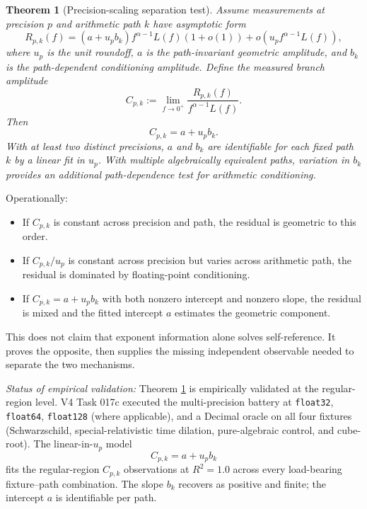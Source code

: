 \documentclass[11pt,a4paper]{article}
\newtheorem{theorem}{Theorem}
\begin{document}
\begin{theorem}[Precision-scaling separation test]\label{thm:precision-separation}
Assume measurements at precision $p$ and arithmetic path $k$ have asymptotic form
\begin{equation}\label{eq:precision-model}
    R_{p,k}(f)=
    \left(a+u_p b_k\right)f^{\alpha-1}L(f)(1+o(1))
    +o(u_p f^{\alpha-1}L(f)),
\end{equation}
where $u_p$ is the unit roundoff, $a$ is the path-invariant geometric amplitude, and $b_k$ is the path-dependent conditioning amplitude. Define the measured branch amplitude
\begin{equation}\label{eq:measured-amplitude}
    C_{p,k}:=\lim_{f\to0^+}\frac{R_{p,k}(f)}{f^{\alpha-1}L(f)}.
\end{equation}
Then
\[
    C_{p,k}=a+u_p b_k.
\]
With at least two distinct precisions, $a$ and $b_k$ are identifiable for each fixed path $k$ by a linear fit in $u_p$. With multiple algebraically equivalent paths, variation in $b_k$ provides an additional path-dependence test for arithmetic conditioning.
\end{theorem}

\noindent
Operationally:
\begin{itemize}
    \item If $C_{p,k}$ is constant across precision and path, the residual is geometric to this order.
    \item If $C_{p,k}/u_p$ is constant across precision but varies across arithmetic path, the residual is dominated by floating-point conditioning.
    \item If $C_{p,k}=a+u_p b_k$ with both nonzero intercept and nonzero slope, the residual is mixed and the fitted intercept $a$ estimates the geometric component.
\end{itemize}

This does not claim that exponent information alone solves self-reference. It proves the opposite, then supplies the missing independent observable needed to separate the two mechanisms.

\smallskip\noindent\emph{Status of empirical validation:} Theorem \ref{thm:precision-separation} is empirically validated at the regular-region level. V4 Task 017c executed the multi-precision battery at \texttt{float32}, \texttt{float64}, \texttt{float128} (where applicable), and a Decimal oracle on all four fixtures (Schwarzschild, special-relativistic time dilation, pure-algebraic control, and cube-root). The linear-in-$u_p$ model
\[
    C_{p,k} = a + u_p b_k
\]
fits the regular-region $C_{p,k}$ observations at $R^2 = 1.0$ across every load-bearing fixture--path combination. The slope $b_k$ recovers as positive and finite; the intercept $a$ is identifiable per path.
\end{document}
